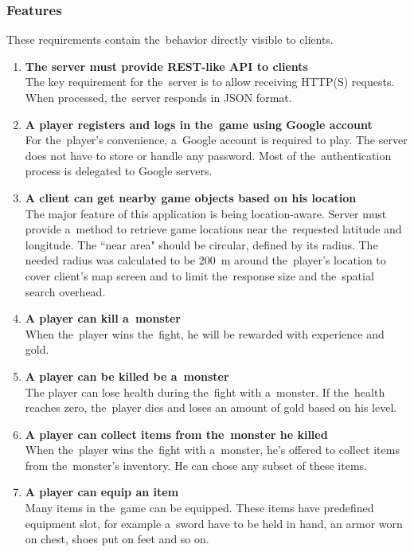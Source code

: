 		\subsubsection*{Features}
		These requirements contain the~behavior directly visible to clients.
		\begin{enumerate}
			\item \textbf{The server must provide REST-like API to clients} \\
			The key requirement for the~server is to allow receiving HTTP(S) requests. When processed, the~server responds in JSON format.
			
			\item \textbf{A player registers and logs in the~game using Google account} \\
			For the~player's convenience, a~Google account is required to play. The server does not have to store or handle any password. Most of the~authentication process is delegated to Google servers.
			
			\item \textbf{A client can get nearby game objects based on his location} \\
			The major feature of this application is being location-aware. Server must provide a~method to retrieve game locations near the~requested latitude and longitude. The ``near area" should be circular, defined by its radius. The needed radius was calculated to be 200~m around the~player's location to cover client's map screen and to limit the~response size and the~spatial search overhead.
			
			\item \textbf{A player can kill a~monster} \\
			When the~player wins the~fight, he will be rewarded with experience and gold. 			
			
			\item \textbf{A player can be killed be a~monster} \\
			The player can lose health during the~fight with a~monster. If the~health reaches zero, the~player dies and loses an amount of gold based on his level.
			
			\item \textbf{A player can collect items from the~monster he killed} \\
			When the~player wins the~fight with a~monster, he's offered to collect items from the~monster's inventory. He can chose any subset of these items.
			
			\item \textbf{A player can equip an item} \\	
			Many items in the~game can be equipped. These items have predefined equipment slot, for example a~sword have to be held in hand, an armor worn on chest, shoes put on feet and so on.
						

\end{enumerate}
